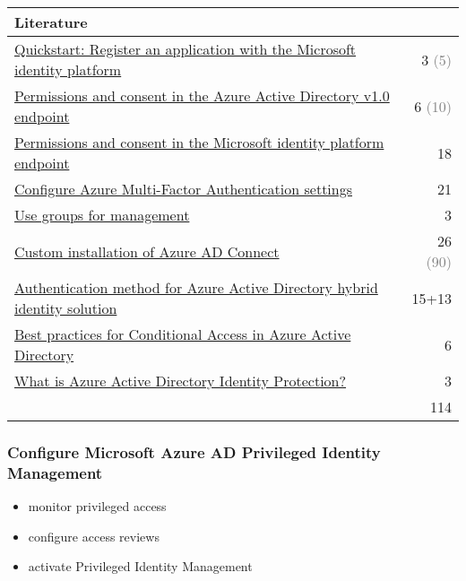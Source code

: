 \begin{tabular}{p{14cm} | r}
\textbf{Literature} & \\
\hline
\href{https://docs.microsoft.com/en-us/azure/active-directory/develop/quickstart-register-app}{Quickstart: Register an application with the Microsoft identity platform} & 3 \textcolor{gray}{(5)} \\
\href{https://docs.microsoft.com/en-us/azure/active-directory/develop/v1-permissions-and-consent}{Permissions and consent in the Azure Active Directory v1.0 endpoint} & 6 \textcolor{gray}{(10)} \\
\href{https://docs.microsoft.com/en-us/azure/active-directory/develop/v2-permissions-and-consent}{Permissions and consent in the Microsoft identity platform endpoint} & 18 \\
\href{https://docs.microsoft.com/en-us/azure/active-directory/authentication/howto-mfa-mfasettings}{Configure Azure Multi-Factor Authentication settings} & 21 \\
\href{https://docs.microsoft.com/en-us/microsoft-365/enterprise/identity-use-group-management}{Use groups for management} & 3 \\
\href{https://docs.microsoft.com/en-us/azure/active-directory/hybrid/how-to-connect-install-custom}{Custom installation of Azure AD Connect} & 26 \textcolor{gray}{(90)} \\
\href{https://docs.microsoft.com/en-us/azure/security/fundamentals/choose-ad-authn}{Authentication method for Azure Active Directory hybrid identity solution} & 15+13 \\
\href{https://docs.microsoft.com/en-us/azure/active-directory/conditional-access/best-practices}{Best practices for Conditional Access in Azure Active Directory} & 6 \\
\href{https://docs.microsoft.com/en-us/azure/active-directory/identity-protection/overview-identity-protection}{What is Azure Active Directory Identity Protection?} & 3 \\
\cline{2-2} 
 & 114
\end{tabular}

\subsubsection{Configure Microsoft Azure AD Privileged Identity Management}
\begin{itemize}
\item monitor privileged access 
\item configure access reviews 
\item activate Privileged Identity Management 
\end{itemize}

